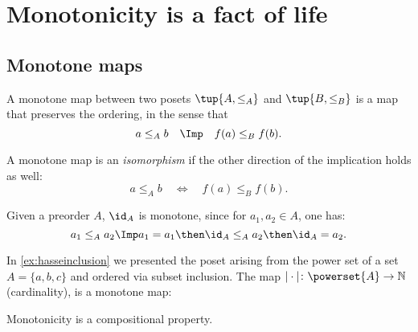 \section{Monotonicity is a fact of life}
\subsection{Monotone maps}
\begin{definition}
A monotone map between two posets
$\tup{A, \leq_A}$ and $\tup{B, \leq_B}$ is a map that preserves the ordering, in the sense that 
\begin{equation}
 a \leq_A b \quad \Imp \quad f(a) \leq_B f(b).
\end{equation}

A monotone map is an \emph{isomorphism} if the other direction
of the implication holds as well:
\begin{equation}
 a \leq_A b \quad \Leftrightarrow \quad f(a) \leq_B f(b).
\end{equation}
\end{definition}

\begin{remark}
Given a preorder $A$, $\id_A$ is monotone, since for $a_1,a_2\in A$, one has:
\begin{equation}
a_1\leq_A a_2 \Imp a_1=a_1\then \id_A \leq_A a_2\then \id_A = a_2.
\end{equation}
\end{remark}



\begin{example}
In \cref{ex:hasseinclusion} we presented the poset arising from the power set of a set $A=\{a,b,c\}$ and ordered via subset inclusion. The map $\vert \cdot \vert \colon \powerset{A}\to \mathbb{N}$ (cardinality), is a monotone map:
\begin{center}
\end{center}
\end{example}
Monotonicity is a compositional property.

